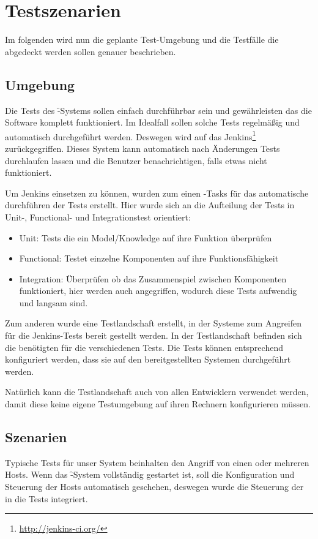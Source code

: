 \section{Testszenarien}
\label{sec:test_scenario}
\authors{\HM, \LM}{\MW}

Im folgenden wird nun die geplante Test-Umgebung und die Testfälle die abgedeckt werden sollen genauer beschrieben.

\subsection{Umgebung}
Die Tests des \f-Systems sollen einfach durchführbar sein und gewährleisten
das die Software komplett funktioniert. Im Idealfall sollen solche Tests
regelmäßig und automatisch durchgeführt werden. Deswegen wird auf das 
Jenkins\footnote{\url{http://jenkins-ci.org/}} zurückgegriffen. Dieses
System kann automatisch nach Änderungen Tests durchlaufen lassen und die
Benutzer benachrichtigen, falls etwas nicht funktioniert.

Um Jenkins einsetzen zu können, wurden zum einen -Tasks für das
automatische durchführen der Tests erstellt. Hier wurde sich an die
 Aufteilung der Tests in Unit-, Functional- und Integrationstest
orientiert:
\begin{itemize}
  \item Unit: Tests die ein Model/Knowledge auf ihre Funktion überprüfen
  \item Functional: Testet einzelne Komponenten auf ihre Funktionsfähigkeit
  \item Integration: Überprüfen ob das Zusammenspiel zwischen Komponenten
funktioniert, hier werden auch  angegriffen, wodurch diese Tests
aufwendig und langsam sind.
\end{itemize}

Zum anderen wurde eine Testlandschaft erstellt, in der Systeme zum Angreifen
für die Jenkins-Tests bereit gestellt werden. In der Testlandschaft befinden
sich die benötigten  für die verschiedenen Tests. Die Tests können
entsprechend konfiguriert werden, dass sie auf den bereitgestellten Systemen
durchgeführt werden.

Natürlich kann die Testlandschaft auch von allen Entwicklern verwendet werden,
damit diese keine eigene Testumgebung auf ihren Rechnern konfigurieren müssen.

\subsection{Szenarien}
Typische Tests für unser System beinhalten den Angriff von einen oder mehreren
Hosts. Wenn das \f-System vollständig gestartet ist, soll die Konfiguration
und Steuerung der Hosts automatisch geschehen, deswegen wurde die Steuerung
der  in die Tests integriert.

